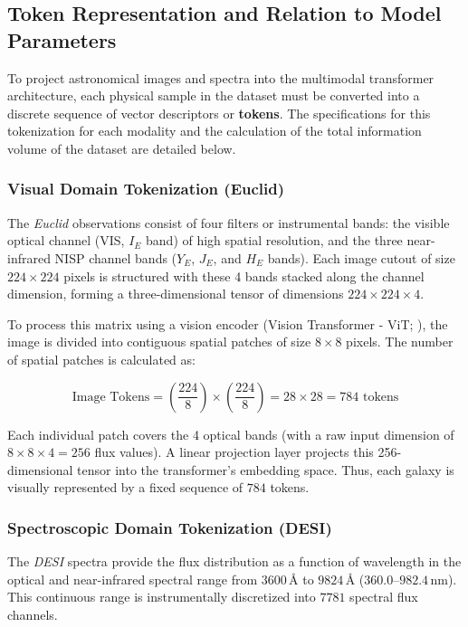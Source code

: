 \subsection{Token Representation and Relation to Model Parameters}

To project astronomical images and spectra into the multimodal transformer architecture, each physical sample in the dataset must be converted into a discrete sequence of vector descriptors or \textbf{tokens}. The specifications for this tokenization for each modality and the calculation of the total information volume of the dataset are detailed below.

\subsubsection{Visual Domain Tokenization (Euclid)}

The \textit{Euclid} observations consist of four filters or instrumental bands: the visible optical channel (VIS, $I_E$ band) of high spatial resolution, and the three near-infrared NISP channel bands ($Y_E$, $J_E$, and $H_E$ bands). Each image cutout of size $224 \times 224$ pixels is structured with these 4 bands stacked along the channel dimension, forming a three-dimensional tensor of dimensions $224 \times 224 \times 4$.

To process this matrix using a vision encoder (Vision Transformer - ViT; \autocite{ar:dosovitskiy-2020}), the image is divided into contiguous spatial patches of size $8 \times 8$ pixels. The number of spatial patches is calculated as:

\begin{equation}
\text{Image Tokens} = \left(\dfrac{224}{8}\right) \times \left(\dfrac{224}{8}\right) = 28 \times 28 = 784 \text{ tokens}
\label{eq:tokens_imagen}
\end{equation}

Each individual patch covers the 4 optical bands (with a raw input dimension of $8 \times 8 \times 4 = 256$ flux values). A linear projection layer projects this 256-dimensional tensor into the transformer's embedding space. Thus, each galaxy is visually represented by a fixed sequence of $784$ tokens.

\subsubsection{Spectroscopic Domain Tokenization (DESI)}

The \textit{DESI} spectra provide the flux distribution as a function of wavelength in the optical and near-infrared spectral range from $3600\,\text{\AA{}}$ to $9824\,\text{\AA{}}$ ($360.0\text{--}982.4\,\text{nm}$). This continuous range is instrumentally discretized into $7781$ spectral flux channels.

